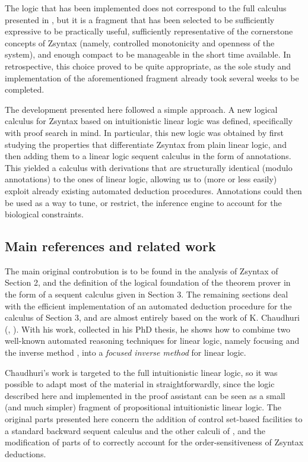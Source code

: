 The logic that has been implemented does not correspond to the full calculus
presented in \cite{adding-logic}, but it is a fragment that has been selected to
be sufficiently expressive to be practically useful, sufficiently representative
of the cornerstone concepts of Zsyntax (namely, controlled monotonicity and
openness of the system), and enough compact to be manageable in the short time
available. In retrospective, this choice proved to be quite appropriate, as the
sole study and implementation of the aforementioned fragment already took
several weeks to be completed.

The development presented here followed a simple approach. A new logical
calculus for Zsyntax based on intuitionistic linear logic was defined,
specifically with proof search in mind. In particular, this new logic was
obtained by first studying the properties that differentiate Zsyntax from plain
linear logic, and then adding them to a linear logic sequent calculus in the
form of annotations.  This yielded a calculus with derivations that are
structurally identical (modulo annotations) to the ones of linear logic,
allowing us to (more or less easily) exploit already existing automated
deduction procedures. Annotations could then be used as a way to tune, or
restrict, the inference engine to account for the biological constraints.

\subsection{Main references and related work}

The main original controbution is to be found in the analysis of Zsyntax of
Section 2, and the definition of the logical foundation of the theorem prover in
the form of a sequent calculus given in Section 3.  The remaining sections deal
with the efficient implementation of an automated deduction procedure for the
calculus of Section 3, and are almost entirely based on the work of K. Chaudhuri
(\cite{chaudhuri-paper}, \cite{chaudhuri-thesis}). With his work, collected in
his PhD thesis, he shows how to combime two well-known automated reasoning
techniques for linear logic, namely focusing \cite{andreoli92} and the inverse
method \cite{inverse}, into a \emph{focused inverse method} for linear logic.

Chaudhuri's work is targeted to the full intuitionistic linear logic, so it was
possible to adapt most of the material in \cite{chaudhuri-thesis}
straightforwardly, since the logic described here and implemented in the proof
assistant can be seen as a small (and much simpler) fragment of propositional
intuitionistic linear logic. The original parts presented here concern the
addition of control set-based facilities to a standard backward sequent calculus
and the other calculi of \cite{chaudhuri-thesis}, and the modification of parts
of to correctly account for the order-sensitiveness of Zsyntax deductions.

